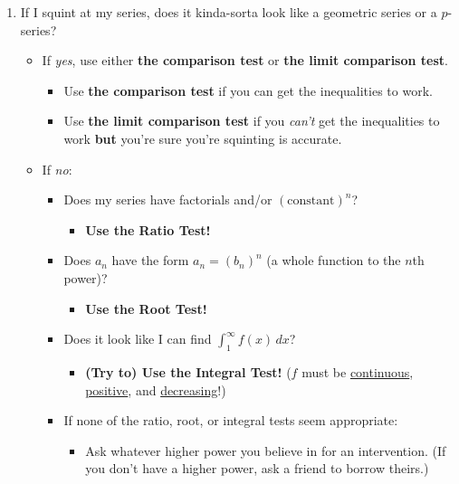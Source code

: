 \documentclass[10pt]{article}
\newcommand{\infsum}[3]{\sum_{{#1}={#2}}^\infty {#3}}
\begin{document}
\begin{enumerate}
		\item If I squint at my series, does it kinda-sorta look like a geometric series or a $p$-series?
			\begin{itemize}
				\item If \textit{yes}, use either \textbf{the comparison test} or \textbf{the limit comparison test}. 
				\begin{itemize}
					\item Use \textbf{the comparison test} if you can get the inequalities to work.
					\item Use \textbf{the limit comparison test} if you \textit{can't} get the inequalities to work \textbf{but} you're sure you're squinting is accurate.
				\end{itemize}
				\item If \textit{no}:
				\begin{itemize}
					\item Does my series have factorials and/or $(\text{constant})^n$? 
						\begin{itemize}
							\item \textbf{Use the Ratio Test!}
						\end{itemize}
					\item Does $a_n$ have the form $a_n=(b_n)^n$ ({\footnotesize{a whole function to the $n$th power}})? 
						\begin{itemize}
							\item \textbf{Use the Root Test!}
						\end{itemize}
					\item Does it look like I can find $\textstyle\int_1^\infty f(x)\,dx$? 
						\begin{itemize}
							\item \textbf{(Try to) Use the Integral Test!} ({\footnotesize{$f$ must be \ul{continuous}, \ul{positive}, and \ul{decreasing}!}})
						\end{itemize}
					\item If none of the ratio, root, or integral tests seem appropriate: 
					\begin{itemize}
						\item Ask whatever higher power you believe in for an intervention. ({\footnotesize{If you don't have a higher power, ask a friend to borrow theirs.}})
					\end{itemize}
				\end{itemize}

\end{itemize}
\end{enumerate}
\end{document}
